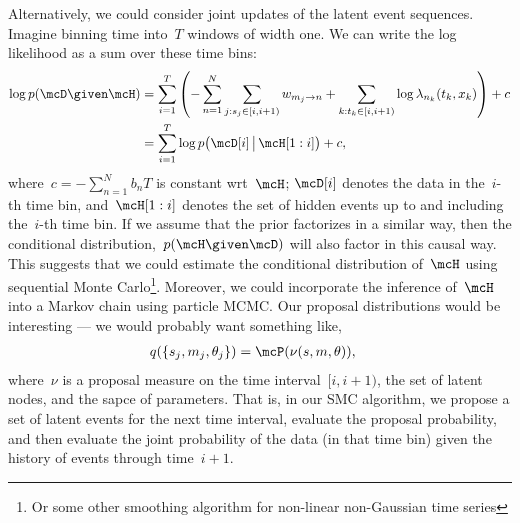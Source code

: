 Alternatively, we could consider joint updates of the
latent event sequences. Imagine binning time into~$T$
windows of width one.  We can write the log likelihood
as a sum over these time bins:
\begin{align}
\log p(\mcD \given \mcH) &=
\sum_{i=1}^T \left(
  -\sum_{n=1}^N \sum_{j: s_j \in [i, i+1)} w_{m_j \to n} 
  + \sum_{k: t_k \in [i, i+1)} \log \lambda_{n_k}(t_k, x_k) 
\right) + c \\
&= \sum_{i=1}^T \log p\big(\mcD[i] \, \big| \, \mcH[1:i]\big) + c,
\end{align}
where~$c=-\sum_{n=1}^N b_nT$ is constant wrt~$\mcH$; $\mcD[i]$
denotes the data in the~$i$-th time bin, and~$\mcH[1:i]$ denotes
the set of hidden events up to and including the~$i$-th time bin.
If we assume that the prior factorizes in a similar way, then the
conditional distribution,~$p(\mcH \given \mcD)$ will also factor
in this causal way. This suggests that we could estimate the
conditional distribution of~$\mcH$ using sequential Monte
Carlo\footnote{Or some other smoothing algorithm for non-linear non-Gaussian
time series}. Moreover, we could incorporate the inference of~$\mcH$
into a Markov chain using particle MCMC. Our proposal distributions
would be interesting --- we would probably want something like,
\begin{align}
  q(\{s_j, m_j, \theta_j\}) &= \mcP(\nu(s, m, \theta)),
\end{align} 
where~$\nu$ is a proposal measure on the time interval~$[i, i+1)$,
the set of latent nodes, and
the sapce of parameters. That is, in our SMC algorithm, we propose
a set of latent events for the next time interval, evaluate the
proposal probability, and then evaluate the joint probability of
the data (in that time bin) given the history of events through time~$i+1$. 



%
%


